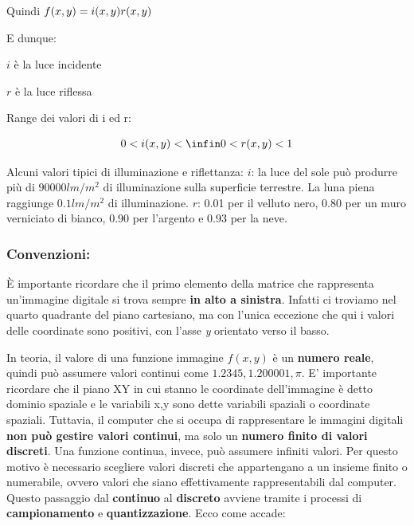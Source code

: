 \documentclass[
]{article}
\begin{document}
Quindi \(f(x,y) = i(x,y)\space r(x,y)\)

E dunque:

\(i\) è la luce incidente

\(r\) è la luce riflessa

Range dei valori di i ed r:

\[
0 < i(x,y) < \infin
\\
0 < r(x,y) < 1
\]

Alcuni valori tipici di illuminazione e riflettanza:
\(i\): la luce del sole può produrre più di \(90000 lm/m^2\) di illuminazione sulla superficie terrestre. La luna piena raggiunge \(0.1 lm/m^2\) di illuminazione.
\(r\): 0.01 per il velluto nero, 0.80 per un muro verniciato di bianco, 0.90 per l'argento e 0.93 per la neve.

\hypertarget{convenzioni}{%
\subsubsection{Convenzioni:}\label{convenzioni}}

È importante ricordare che il primo elemento della matrice che rappresenta un'immagine digitale si trova sempre \textbf{in alto a sinistra}. Infatti ci troviamo nel quarto quadrante del piano cartesiano, ma con l'unica eccezione che qui i valori delle coordinate sono positivi, con l'asse \emph{y} orientato verso il basso.

In teoria, il valore di una funzione immagine \(f(x,y)\) è un \textbf{numero reale}, quindi può assumere valori continui come \(1.2345, 1.200001, \pi\).
E' importante ricordare che il piano XY in cui stanno le coordinate dell'immagine è detto dominio spaziale e le variabili x,y sono dette variabili spaziali o coordinate spaziali.
Tuttavia, il computer che si occupa di rappresentare le immagini digitali \textbf{non può gestire valori continui}, ma solo un \textbf{numero finito di valori discreti}. Una funzione continua, invece, può assumere infiniti valori.
Per questo motivo è necessario scegliere valori discreti che appartengano a un insieme finito o numerabile, ovvero valori che siano effettivamente rappresentabili dal computer. Questo passaggio dal \textbf{continuo} al \textbf{discreto} avviene tramite i processi di \textbf{campionamento} e \textbf{quantizzazione}.
Ecco come accade:
\end{document}
